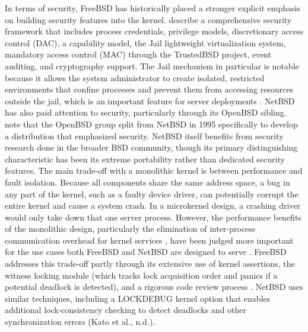 In terms of security, FreeBSD has historically placed a stronger explicit emphasis on building security features into the kernel. \textcite{watson2015} describe a comprehensive security framework that includes process credentials, privilege models, discretionary access control (DAC), a capability model, the Jail lightweight virtualization system, mandatory access control (MAC) through the TrustedBSD project, event auditing, and cryptography support. The Jail mechanism in particular is notable because it allows the system administrator to create isolated, restricted environments that confine processes and prevent them from accessing resources outside the jail, which is an important feature for server deployments \parencite{watson2015}.
NetBSD has also paid attention to security, particularly through its OpenBSD sibling. \textcite{watson2015} note that the OpenBSD group split from NetBSD in 1995 specifically to develop a distribution that emphasized security. NetBSD itself benefits from security research done in the broader BSD community, though its primary distinguishing characteristic has been its extreme portability rather than dedicated security features.
The main trade-off with a monolithic kernel is between performance and fault isolation. Because all components share the same address space, a bug in any part of the kernel, such as a faulty device driver, can potentially corrupt the entire kernel and cause a system crash. In a microkernel design, a crashing driver would only take down that one server process. However, the performance benefits of the monolithic design, particularly the elimination of inter-process communication overhead for kernel services , have been judged more important for the use cases both FreeBSD and NetBSD are designed to serve \parencite{watson2015}.
FreeBSD addresses this trade-off partly through its extensive use of kernel assertions, the witness locking module (which tracks lock acquisition order and panics if a potential deadlock is detected), and a rigorous code review process \parencite{watson2015}. NetBSD uses similar techniques, including a LOCKDEBUG kernel option that enables additional lock-consistency checking to detect deadlocks and other synchronization errors (Kato et al., n.d.).

